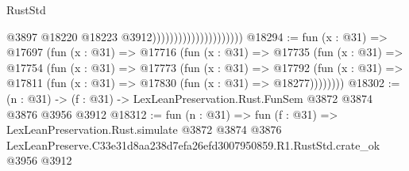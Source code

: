 \begin{lexlean}{RustStd}
\begin{coremodule}
                                              @3897
                                              @18220
                                              @18223
                                              @3912)))))))))))))))))))))
@18294 := fun (x : @31) =>
  @17697
    (fun (x : @31) =>
    @17716
      (fun (x : @31) =>
      @17735
        (fun (x : @31) =>
        @17754
          (fun (x : @31) =>
          @17773
            (fun (x : @31) =>
            @17792
              (fun (x : @31) => @17811 (fun (x : @31) => @17830 (fun (x : @31) => @18277))))))))
@18302 := (n : @31) -> (f : @31) -> LexLeanPreservation.Rust.FunSem @3872 @3874 @3876 @3956 @3912
@18312 := fun (n : @31) =>
  fun (f : @31) =>
  LexLeanPreservation.Rust.simulate
    @3872
    @3874
    @3876
    LexLeanPreserve.C33e31d8aa238d7efa26efd3007950859.R1.RustStd.crate_ok
    @3956
    @3912
\end{coremodule}
\end{lexlean}
